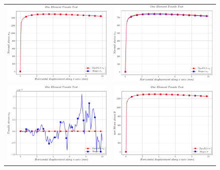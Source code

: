 \begin{figure}[h]
\begin{centering}
\begin{tabular}{cc}
\includegraphics[width=0.45\columnwidth]{Figures/Samples/Element/Tensile3D_stress_11} & \includegraphics[width=0.45\columnwidth]{Figures/Samples/Element/Tensile3D_stress_22}\tabularnewline
\includegraphics[width=0.45\columnwidth]{Figures/Samples/Element/Tensile3D_stress_12} & \includegraphics[width=0.45\columnwidth]{Figures/Samples/Element/Tensile3D_vonMises}\tabularnewline

\end{tabular}
\end{centering}
\end{figure}
